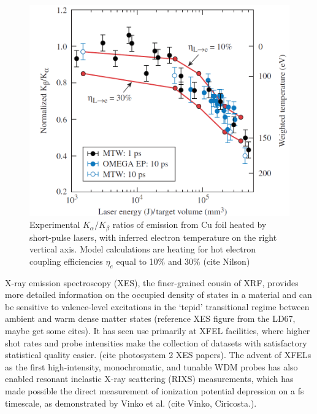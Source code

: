 \documentclass [11pt, proquest, article] {uwthesis}[2016/11/22]
\begin{document}
\begin{figure}[h] \label{fig:nilson}
\caption{Experimental $K_\alpha/K_\beta$ ratios of emission from Cu foil heated by short-pulse lasers, with inferred electron temperature on the right vertical axis. Model calculations are heating for hot electron coupling efficiencies $\eta_e$ equal to 10\% and 30\% (cite Nilson)}
\centering
\includegraphics[scale=0.5]{../Figures/nilson_branching.png}
\end{figure}

X-ray emission spectroscopy (XES), the finer-grained cousin of XRF, provides more detailed information on the occupied density of states in a material and can be sensitive to valence-level excitations in the `tepid' transitional regime between ambient and warm dense matter states (reference XES figure from the LD67, maybe get some cites). It has seen use primarily at XFEL facilities, where higher shot rates and probe intensities make the collection of datasets with satisfactory statistical quality easier. (cite photosystem 2 XES papers). The advent of XFELs as the first high-intensity, monochromatic, and tunable WDM probes has also enabled resonant inelastic X-ray scattering (RIXS) measurements, which has made possible the direct measurement of ionization potential depression on a fs timescale, as demonstrated by Vinko et al. (cite Vinko, Ciricosta.).

\end{document}

